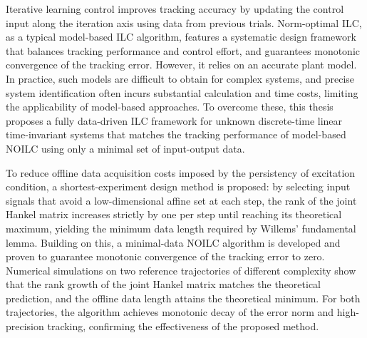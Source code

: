 \begin{eabstract}
Iterative learning control improves tracking accuracy by updating the control
input along the iteration axis using data from previous trials.
Norm-optimal ILC, as a typical model-based ILC algorithm, features a systematic design framework that balances
tracking performance and control effort, and guarantees monotonic convergence of the
tracking error. However, it relies on an accurate plant model. In practice, such models
are difficult to obtain for complex systems, and precise system identification often
incurs substantial calculation and time costs, limiting the applicability of model-based
approaches. To overcome these, this thesis proposes a fully data-driven ILC
framework for unknown discrete-time linear time-invariant systems that matches the
tracking performance of model-based NOILC using only a minimal set of
input-output data.

To reduce offline data acquisition costs imposed by the
persistency of excitation condition, a shortest-experiment design method is proposed:
by selecting input signals that avoid a low-dimensional affine set at each step, the
rank of the joint Hankel matrix increases strictly by one per step until reaching its
theoretical maximum, yielding the minimum data length required by
Willems' fundamental lemma. Building on this, a minimal-data NOILC algorithm is
developed and proven to guarantee monotonic convergence of the tracking error to zero.
Numerical simulations on two reference trajectories of different complexity show that
the rank growth of the joint Hankel matrix matches the theoretical prediction,
and the offline data length attains the theoretical minimum. For both trajectories,
the algorithm achieves monotonic decay of the error norm and high-precision tracking,
confirming the effectiveness of the proposed method.
\end{eabstract}